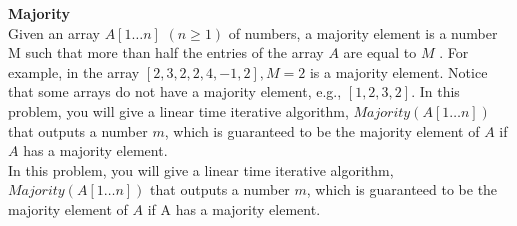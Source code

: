 \textbf{Majority} \\
Given an array $A[1 \ldots n]$ $(n \geq 1)$ of numbers, a majority element is a number M such that more than
half the entries of the array $A$ are equal to $M$ . For example, in the array $[2, 3, 2, 2, 4,-1, 2], M = 2$ is
a majority element. Notice that some arrays do not have a majority element, e.g., $[1, 2, 3, 2]$.
In this problem, you will give a linear time iterative algorithm, $Majority(A[1 \ldots n])$ that outputs a
number $m$, which is guaranteed to be the majority element of $A$ if $A$ has a majority element. \\

In this problem, you will give a linear time iterative algorithm, $Majority(A[1 \ldots n])$ that outputs a
number $m$, which is guaranteed to be the majority element of $A$ if A has a majority element.

